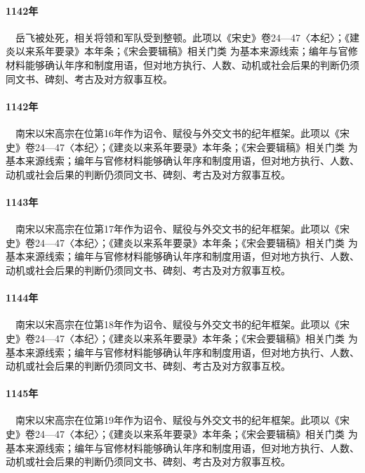 \paragraph{1142年}　岳飞被处死，相关将领和军队受到整顿。此项以《宋史》卷24—47〈本纪〉；《建炎以来系年要录》本年条；《宋会要辑稿》相关门类 为基本来源线索；编年与官修材料能够确认年序和制度用语，但对地方执行、人数、动机或社会后果的判断仍须同文书、碑刻、考古及对方叙事互校。

\paragraph{1142年}　南宋以宋高宗在位第16年作为诏令、赋役与外交文书的纪年框架。此项以《宋史》卷24—47〈本纪〉；《建炎以来系年要录》本年条；《宋会要辑稿》相关门类 为基本来源线索；编年与官修材料能够确认年序和制度用语，但对地方执行、人数、动机或社会后果的判断仍须同文书、碑刻、考古及对方叙事互校。

\paragraph{1143年}　南宋以宋高宗在位第17年作为诏令、赋役与外交文书的纪年框架。此项以《宋史》卷24—47〈本纪〉；《建炎以来系年要录》本年条；《宋会要辑稿》相关门类 为基本来源线索；编年与官修材料能够确认年序和制度用语，但对地方执行、人数、动机或社会后果的判断仍须同文书、碑刻、考古及对方叙事互校。

\paragraph{1144年}　南宋以宋高宗在位第18年作为诏令、赋役与外交文书的纪年框架。此项以《宋史》卷24—47〈本纪〉；《建炎以来系年要录》本年条；《宋会要辑稿》相关门类 为基本来源线索；编年与官修材料能够确认年序和制度用语，但对地方执行、人数、动机或社会后果的判断仍须同文书、碑刻、考古及对方叙事互校。

\paragraph{1145年}　南宋以宋高宗在位第19年作为诏令、赋役与外交文书的纪年框架。此项以《宋史》卷24—47〈本纪〉；《建炎以来系年要录》本年条；《宋会要辑稿》相关门类 为基本来源线索；编年与官修材料能够确认年序和制度用语，但对地方执行、人数、动机或社会后果的判断仍须同文书、碑刻、考古及对方叙事互校。

